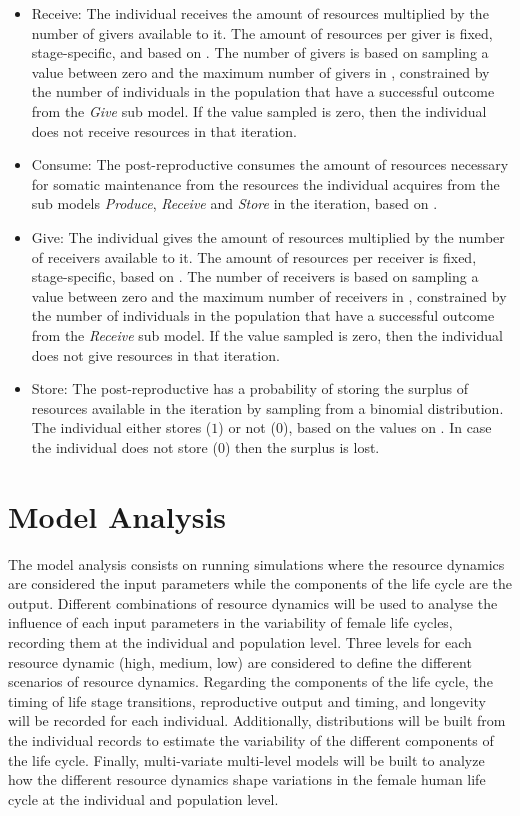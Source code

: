 \documentclass{article}
\begin{document}
\begin{itemize}
\begin{itemize}
        \item Receive: The individual receives the amount of resources multiplied by the number of givers available to it. The amount of resources per giver is fixed, stage-specific, and based on \cite{gurven2004give}. The number of givers is based on sampling a value between zero and the maximum number of givers in \cite{gurven2004give}, constrained by the number of individuals in the population that have a successful outcome from the \emph{Give} sub model. If the value sampled is zero, then the individual does not receive resources in that iteration.
        \item Consume: The post-reproductive consumes the amount of resources necessary for somatic maintenance from the resources the individual acquires from the sub models \emph{Produce}, \emph{Receive} and \emph{Store} in the iteration, based on \cite{kaplan2000theory, pontzer2021daily}.
        \item Give: The individual gives the amount of resources multiplied by the number of receivers available to it. The amount of resources per receiver is fixed, stage-specific, based on \cite{gurven2004give}. The number of receivers is based on sampling a value between zero and the maximum number of receivers in \cite{gurven2004give}, constrained by the number of individuals in the population that have a successful outcome from the \emph{Receive} sub model. If the value sampled is zero, then the individual does not give resources in that iteration.
        \item Store: The post-reproductive has a probability of storing the surplus of resources available in the iteration by sampling from a binomial distribution. The individual either stores ($1$) or not ($0$), based on the values on \citep{bowles2011cultivation}. In case the individual does not store ($0$) then the surplus is lost.
    \end{itemize}
\end{itemize}

\section{Model Analysis}

The model analysis consists on running simulations where the resource dynamics are considered the input parameters while the components of the life cycle are the output. Different combinations of resource dynamics will be used to analyse the influence of each input parameters in the variability of female life cycles, recording them at the individual and population level. Three levels for each resource dynamic (high, medium, low) are considered to define the different scenarios of resource dynamics. Regarding the components of the life cycle, the timing of life stage transitions, reproductive output and timing, and longevity will be recorded for each individual. Additionally, distributions will be built from the individual records to estimate the variability of the different components of the life cycle. Finally, multi-variate multi-level models will be built to analyze how the different resource dynamics shape variations in the female human life cycle at the individual and population level.
\end{document}
